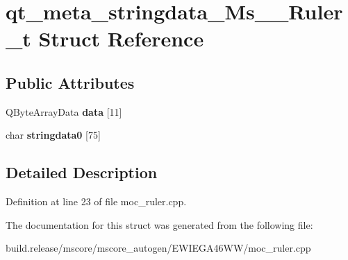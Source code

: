 \hypertarget{structqt__meta__stringdata___ms_____ruler__t}{}\section{qt\+\_\+meta\+\_\+stringdata\+\_\+\+Ms\+\_\+\+\_\+\+Ruler\+\_\+t Struct Reference}
\label{structqt__meta__stringdata___ms_____ruler__t}
\subsection*{Public Attributes}
\begin{DoxyCompactItemize}
\item 
\mbox{\label{structqt__meta__stringdata___ms_____ruler__t_afd8664610a0c1407f07c616b95e48fbc}} 
Q\+Byte\+Array\+Data {\bfseries data} \mbox{[}11\mbox{]}
\item 
\mbox{\label{structqt__meta__stringdata___ms_____ruler__t_a4155de004696474c25a4d859e7fcc4e4}} 
char {\bfseries stringdata0} \mbox{[}75\mbox{]}
\end{DoxyCompactItemize}


\subsection{Detailed Description}


Definition at line 23 of file moc\+\_\+ruler.\+cpp.



The documentation for this struct was generated from the following file\+:\begin{DoxyCompactItemize}
\item 
build.\+release/mscore/mscore\+\_\+autogen/\+E\+W\+I\+E\+G\+A46\+W\+W/moc\+\_\+ruler.\+cpp\end{DoxyCompactItemize}
